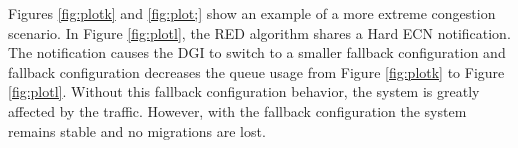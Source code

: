 Figures \ref{fig:plotk} and \ref{fig:plot;} show an example of a more extreme congestion scenario.
In Figure \ref{fig:plotl}, the \ac{RED} algorithm shares a Hard \ac{ECN} notification.
The notification causes the \ac{DGI} to switch to a smaller fallback configuration and fallback configuration decreases the queue usage from Figure \ref{fig:plotk} to Figure \ref{fig:plotl}.
Without this fallback configuration behavior, the system is greatly affected by the traffic.
However, with the fallback configuration the system remains stable and no migrations are lost.

